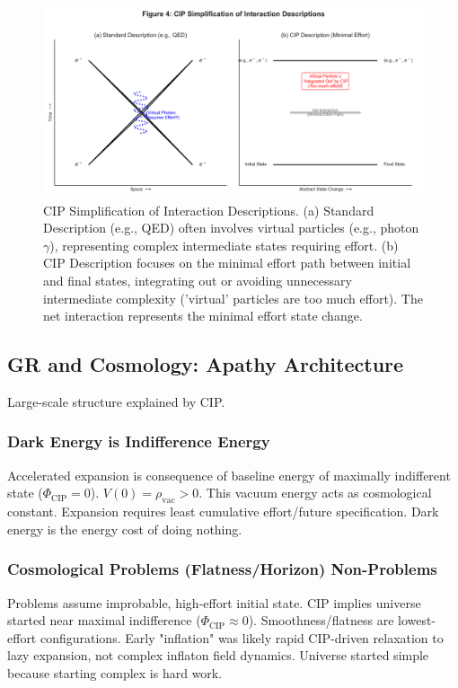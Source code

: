 \documentclass[11pt, a4paper]{article}
\newcommand{\subt}[1]{\mathrm{#1}}
\begin{document}
\begin{figure}[H]
    \centering
    \includegraphics[width=\textwidth]{CIP_Interactions.png}
    \caption[CIP Simplification of Interaction Descriptions]{CIP Simplification of Interaction Descriptions. (a) Standard Description (e.g., QED) often involves virtual particles (e.g., photon $\gamma$), representing complex intermediate states requiring effort. (b) CIP Description focuses on the minimal effort path between initial and final states, integrating out or avoiding unnecessary intermediate complexity ('virtual' particles are too much effort). The net interaction represents the minimal effort state change.}
    \label{fig:interactions}
\end{figure}


\subsection{GR and Cosmology: Apathy Architecture}

Large-scale structure explained by CIP.

\subsubsection{Dark Energy is Indifference Energy}
Accelerated expansion is consequence of baseline energy of maximally indifferent state ($\Phi_{\subt{CIP}}=0$). $V(0) = \rho_{\subt{vac}} > 0$. This vacuum energy acts as cosmological constant. Expansion requires least cumulative effort/future specification. Dark energy is the energy cost of doing nothing.

\subsubsection{Cosmological Problems (Flatness/Horizon) Non-Problems}
Problems assume improbable, high-effort initial state. CIP implies universe started near maximal indifference ($\Phi_{\subt{CIP}} \approx 0$). Smoothness/flatness are lowest-effort configurations. Early "inflation" was likely rapid CIP-driven relaxation to lazy expansion, not complex inflaton field dynamics. Universe started simple because starting complex is hard work.
\end{document}
